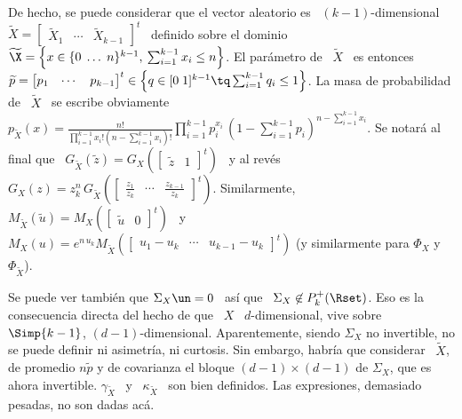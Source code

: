De hecho, se puede considerar que el vector aleatorio es \ $(k-1)$-dimensional \
$\widetilde{X}     =    \begin{bmatrix}     \widetilde{X}_1    &     \cdots    &
  \widetilde{X}_{k-1}   \end{bmatrix}^t$   \  definido   sobre   el  dominio   \
$\widetilde{\X} = \left\{ x \in \{ 0 \; \ldots \; n\}^{k-1}, \: \sum_{i=1}^{k-1}
  x_i  \le n  \right\}$. El  par\'ametro de  \ $\widetilde{X}$  \ es  entonces \
$\widetilde{p}     =     \protect\begin{bmatrix}      p_1     &     \cdots     &
  p_{k-1}  \end{bmatrix}^t\protect  \in  \left\{   q  \in  [0  \;  1]^{k-1}  \tq
  \sum_{i=1}^{k-1}  q_i  \le  1  \right\}$.    La  masa  de  probabilidad  de  \
$\widetilde{X}$   \   se    escribe   obviamente   \   $p_{\widetilde{X}}(x)   =
\frac{n!}{\prod_{i=1}^{k-1} x_i!   (n-\sum_{i=1}^{k-1} x_i)!}  \prod_{i=1}^{k-1}
p_i^{x_i} \, \left( 1  - \sum_{i=1}^{k-1} p_i \right)^{n-\sum_{i=1}^{k-1} x_i}$.
Se  notar\'a al  final que  \ $G_{\widetilde{X}}\left(  \widetilde{z}  \right) =
G_X\left(  \begin{bmatrix} \widetilde{z}  & 1  \end{bmatrix}^t \right)$  \  y al
rev\'es   \   $G_X(z)  =   z_k^n   \,  G_{\widetilde{X}}\left(   \begin{bmatrix}
    \frac{z_1}{z_k}  & \cdots  &  \frac{z_{k-1}}{z_k} \end{bmatrix}^t  \right)$.
Similarmente,    \     $M_{\widetilde{X}}\left(    \widetilde{u}    \right)    =
M_X\left(  \begin{bmatrix} \widetilde{u}  &  0 \end{bmatrix}^t  \right)$  \ y  \
$M_X(u)  = e^{n  \, u_k}  M_{\widetilde{X}}\left(  \begin{bmatrix} u_1  - u_k  &
    \cdots  &  u_{k-1}  -  u_k  \end{bmatrix}^t \right)$  (y  similarmente  para
$\Phi_X$ y $\Phi_{\widetilde{X}}$).

Se puede ver  tambi\'en que $\Sigma_X \un  = 0$ \ as\'i que  \ $\Sigma_X \not\in
P_k^+(\Rset)$.   Eso  es la  consecuencia  directa  del hecho  de  que  \ $X$  \
$d$-dimensional, vive sobre  \ $\Simp{k-1}$, $(d-1)$-dimensional. Aparentemente,
siendo  $\Sigma_X$  no  invertible,  no  se  puede  definir  ni  asimetr\'ia,  ni
curtosis. Sin embargo, habr\'ia que considerar \ $\widetilde{X}$, de promedio $n
\widetilde{p}$ y de covarianza el bloque $(d-1) \times (d-1)$ de $\Sigma_X$, que es
ahora invertible. $\gamma_{\widetilde{X}}$ \  y \ $\kappa_{\widetilde{X}}$ \ son
bien definidos. Las expresiones, demasiado pesadas, no son dadas ac\'a.

